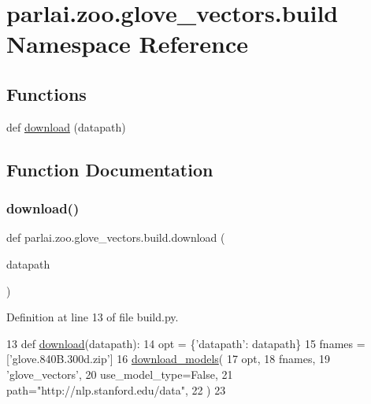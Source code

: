 \hypertarget{namespaceparlai_1_1zoo_1_1glove__vectors_1_1build}{}\section{parlai.\+zoo.\+glove\+\_\+vectors.\+build Namespace Reference}
\label{namespaceparlai_1_1zoo_1_1glove__vectors_1_1build}
\subsection*{Functions}
\begin{DoxyCompactItemize}
\item 
def \hyperlink{namespaceparlai_1_1zoo_1_1glove__vectors_1_1build_a125629618a62d8b36813296c76e9cf8b}{download} (datapath)
\end{DoxyCompactItemize}


\subsection{Function Documentation}
\mbox{\label{namespaceparlai_1_1zoo_1_1glove__vectors_1_1build_a125629618a62d8b36813296c76e9cf8b}} 
\subsubsection{\texorpdfstring{download()}{download()}}
{\footnotesize\ttfamily def parlai.\+zoo.\+glove\+\_\+vectors.\+build.\+download (\begin{DoxyParamCaption}\item[{}]{datapath }\end{DoxyParamCaption})}



Definition at line 13 of file build.\+py.


\begin{DoxyCode}
13 \textcolor{keyword}{def }\hyperlink{namespaceparlai_1_1zoo_1_1pretrained__transformers_1_1build_afaead0deab400e1c516706e85dd4ed9b}{download}(datapath):
14     opt = \{\textcolor{stringliteral}{'datapath'}: datapath\}
15     fnames = [\textcolor{stringliteral}{'glove.840B.300d.zip'}]
16     \hyperlink{namespaceparlai_1_1core_1_1build__data_ab697f23f05d3e36d7979fe5e0ed7911e}{download\_models}(
17         opt,
18         fnames,
19         \textcolor{stringliteral}{'glove\_vectors'},
20         use\_model\_type=\textcolor{keyword}{False},
21         path=\textcolor{stringliteral}{"http://nlp.stanford.edu/data"},
22     )
23 \end{DoxyCode}
